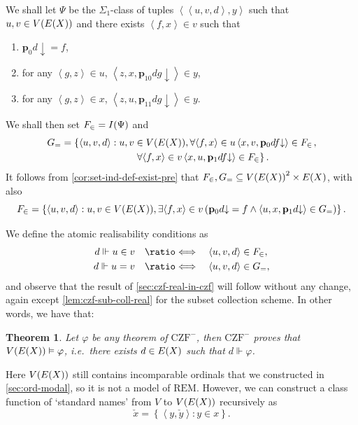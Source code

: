 \documentclass[12pt,openany]{book}
\theoremstyle{plain}
\newtheorem{theorem}{Theorem}[section]
\theoremstyle{definition}
\newcommand\uplabel[1]{\textup{(#1)}}
\newcommand\tuple[1]{\left\langle #1 \right\rangle}
\newcommand\opA[1]{\mathop{\forall #1}}
\newcommand\opE[1]{\mathop{\exists #1}}
\newcommand\defeqv{\quad \ratio\Longleftrightarrow \quad}
\newcommand\CZF{\mathrm{CZF}}
\newcommand\REM{\mathrm{REM}}
\newcommand\bp{\mathbf{p}}
\begin{document}
We shall let $\Psi$ be the $\Sigma_1$-class of tuples $\tuple{\tuple{u, v, d}, y}$ such that $u, v \in V\mleft(E\mleft(X\mright)\mright)$ and there exists $\tuple{f, x} \in v$ such that
\begin{enumerate}[label=\uplabel{\roman*}]
  \item $\bp_0 d {\downarrow} = f$,
  \item for any $\tuple{g, z} \in u$, $\tuple{z, x, \bp_{10} dg {\downarrow}} \in y$,
  \item for any $\tuple{g, z} \in x$, $\tuple{z, u, \bp_{11} dg {\downarrow}} \in y$.
\end{enumerate}
We shall then set $F_\in = I\mleft(\Psi\mright)$ and
\[G_= = \begin{aligned}[t]
     & {\left\{\tuple{u, v, d} : u, v \in V\mleft(E\mleft(X\mright)\mright), \opA{{\tuple{f, x} \in u}} \tuple{x, v, \bp_0 df {\downarrow}} \in F_\in \right.}, \\
     & \qquad \qquad \qquad \left.{} \opA{{\tuple{f, x} \in v}} \tuple{x, u, \bp_1 df {\downarrow}} \in F_\in\right\}.
  \end{aligned}\]
It follows from \autoref{cor:set-ind-def-exist-pre} that $F_\in, G_= \subseteq V\mleft(E\mleft(X\mright)\mright)^2 \times E\mleft(X\mright)$, with also
\[F_\in = \left\{\tuple{u, v, d} : u, v \in V\mleft(E\mleft(X\mright)\mright), \opE{{\tuple{f, x} \in v}} \left(\bp_0 d {\downarrow} = f \land \tuple{u, x, \bp_1 d {\downarrow}} \in G_=\right)\right\}.\]

We define the atomic realisability conditions as
\begin{align*}
  d \Vdash u \in v & \defeqv \tuple{u, v, d} \in F_\in, \\
  d \Vdash u = v   & \defeqv \tuple{u, v, d} \in G_=,
\end{align*}
and observe that the result of \autoref{sec:czf-real-in-czf} will follow without any change, again except \autoref{lem:czf-sub-coll-real} for the subset collection scheme. In other words, we have that:
\begin{theorem}
  Let $\varphi$ be any theorem of $\CZF^-$, then $\CZF^-$ proves that $V\mleft(E\mleft(X\mright)\mright) \vDash \varphi$, i.e.\ there exists $d \in E\mleft(X\mright)$ such that $d \Vdash \varphi$.
\end{theorem}

Here $V\mleft(E\mleft(X\mright)\mright)$ still contains incomparable ordinals that we constructed in \autoref{sec:ord-modal}, so it is not a model of $\REM$. However, we can construct a class function of `standard names' from $V$ to $V\mleft(E\mleft(X\mright)\mright)$ recursively as
\[\check{x} = \left\{\tuple{y, \check{y}} : y \in x\right\}.\]
\end{document}

